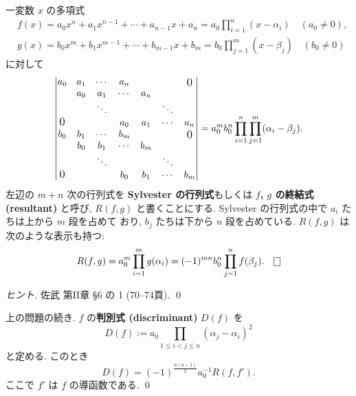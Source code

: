 \documentclass[12pt,twoside]{jarticle}
\begin{document}
\begin{question}
  一変数 $x$ の多項式
  \begin{align*}
    &
    f(x) = a_0x^n+a_1x^{n-1}+\cdots+a_{n-1}x+a_n 
    = a_0 \prod_{i=1}^n(x - \alpha_i)
    \quad (a_0\ne 0),
    \\ &
    g(x) = b_0x^m+b_1x^{m-1}+\cdots+b_{m-1}x+b_m 
    = b_0 \prod_{j=1}^m(x - \beta_j)
    \quad (b_0\ne 0)
  \end{align*}
  に対して
  \begin{equation*}
    \begin{vmatrix}
      a_0 & a_1 & \cdots & a_n    &     && \bigzerou \\
          & a_0 & a_1    & \cdots & a_n && \\
          &     & \ddots &        &     & \ddots & \\
      \bigzerol &&       & a_0    & a_1 & \cdots & a_n \\
      b_0 & b_1 & \cdots & b_m    &     && \bigzerou \\
          & b_0 & b_1    & \cdots & b_m && \\
          &     & \ddots &        &     & \ddots & \\
      \bigzerol &&       & b_0    & b_1 & \cdots & b_m \\
    \end{vmatrix}
    = a_0^mb_0^n\prod_{i=1}^n\prod_{j=1}^m (\alpha_i-\beta_j).
  \end{equation*}
  左辺の $m+n$ 次の行列式を {\bf Sylvester の行列式}もしくは
  {\bf $f$, $g$ の終結式 (resultant)} と呼び, $R(f,g)$ と書くことにする.
  Sylvester の行列式の中で $a_i$ たちは上から $m$ 段を占めて
  おり, $b_j$ たちは下から $n$ 段を占めている.
  $R(f,g)$ は次のような表示も持つ:
  \begin{equation*}
    R(f,g) 
    = a_0^m \prod_{i=1}^m g(\alpha_i)
    = (-1)^{mn}b_0^n\prod_{j=1}^n f(\beta_j).
    \qed
  \end{equation*}
\end{question}

\begin{proof}[ヒント]
  佐武 \cite{satake} 第II章 \S 6 の 1 (70--74頁). \qed
\end{proof}

\begin{question}[判別式]
  上の問題の続き.
  $f$ の{\bf 判別式 (discriminant)} $D(f)$ を
  \begin{equation*}
    D(f) := a_0\prod_{1\le i<j \le n} (\alpha_j - \alpha_i)^2
  \end{equation*}
  と定める.  このとき
  \begin{equation*}
    D(f) = (-1)^{\frac{n(n-1)}{2}} a_0^{-1} R(f,f').
  \end{equation*}
  ここで $f'$ は $f$ の導函数である. \qed
\end{question}
\end{document}
